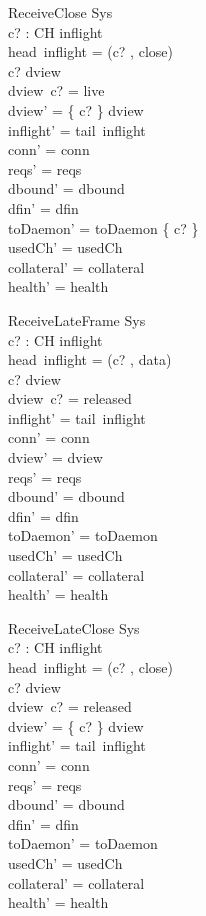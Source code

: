 \documentclass[a4paper,10pt,fleqn]{article}
\begin{document}
\begin{schema}{ReceiveClose}
  \Delta Sys \\
  c? : CH
\where
  inflight \neq \langle \rangle \\
  head~inflight = (c? , close) \\
  c? \in \dom dview \\
  dview~c? = live \\
  dview' = \{ c? \} \ndres dview \\
  inflight' = tail~inflight \\
  conn' = conn \\
  reqs' = reqs \\
  dbound' = dbound \\
  dfin' = dfin \\
  toDaemon' = toDaemon \cup \{ c? \} \\
  usedCh' = usedCh \\
  collateral' = collateral \\
  health' = health
\end{schema}

\begin{schema}{ReceiveLateFrame}
  \Delta Sys \\
  c? : CH
\where
  inflight \neq \langle \rangle \\
  head~inflight = (c? , data) \\
  c? \in \dom dview \\
  dview~c? = released \\
  inflight' = tail~inflight \\
  conn' = conn \\
  dview' = dview \\
  reqs' = reqs \\
  dbound' = dbound \\
  dfin' = dfin \\
  toDaemon' = toDaemon \\
  usedCh' = usedCh \\
  collateral' = collateral \\
  health' = health
\end{schema}

\begin{schema}{ReceiveLateClose}
  \Delta Sys \\
  c? : CH
\where
  inflight \neq \langle \rangle \\
  head~inflight = (c? , close) \\
  c? \in \dom dview \\
  dview~c? = released \\
  dview' = \{ c? \} \ndres dview \\
  inflight' = tail~inflight \\
  conn' = conn \\
  reqs' = reqs \\
  dbound' = dbound \\
  dfin' = dfin \\
  toDaemon' = toDaemon \\
  usedCh' = usedCh \\
  collateral' = collateral \\
  health' = health
\end{schema}
\end{document}
